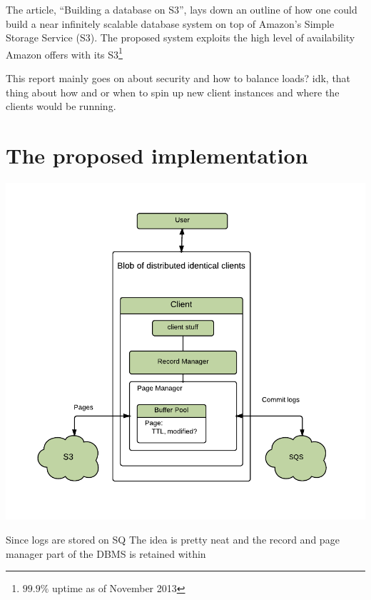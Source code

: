 \documentclass[11pt]{article}
\begin{document}
The article, ``Building a database on S3'', lays down an outline of how one could build a near infinitely scalable database system on top of Amazon's Simple Storage Service (S3).
The proposed system exploits the high level of availability Amazon offers with its S3\footnote{$99.9\%$ uptime as of November 2013}

This report mainly goes on about security and how to balance loads? idk, that thing about how and or when to spin up new client instances and where the clients would be running.

\section{The proposed implementation}

\includegraphics{img/proposed-architecture.pdf}

Since logs are stored on SQ
The idea is pretty neat and 
the record and page manager part of the DBMS is retained within 
\end{document}
